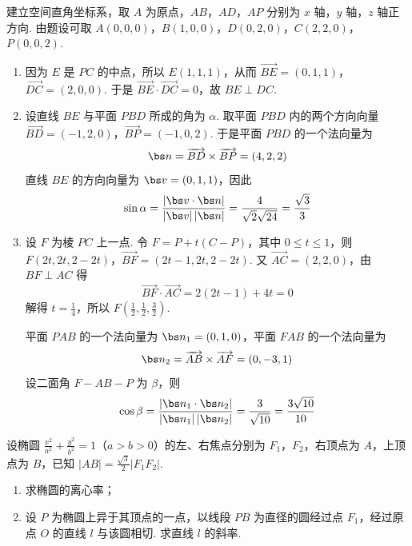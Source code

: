 \begin{solution}
建立空间直角坐标系，取 \(A\) 为原点，\(AB\)，\(AD\)，\(AP\) 分别为 \(x\) 轴，\(y\) 轴，\(z\) 轴正方向. 由题设可取 \(A(0,0,0)\)，\(B(1,0,0)\)，\(D(0,2,0)\)，\(C(2,2,0)\)，\(P(0,0,2)\).

\begin{enumerate}
\item 因为 \(E\) 是 \(PC\) 的中点，所以 \(E(1,1,1)\)，从而 \(\overrightarrow{BE}=(0,1,1)\)，\(\overrightarrow{DC}=(2,0,0)\). 于是 \(\overrightarrow{BE}\cdot\overrightarrow{DC}=0\)，故 \(BE\perp DC\).

\item 设直线 \(BE\) 与平面 \(PBD\) 所成的角为 \(\alpha\). 取平面 \(PBD\) 内的两个方向向量 \(\overrightarrow{BD}=(-1,2,0)\)，\(\overrightarrow{BP}=(-1,0,2)\). 于是平面 \(PBD\) 的一个法向量为
\[
\bs n=\overrightarrow{BD}\times\overrightarrow{BP}=(4,2,2)
\]
直线 \(BE\) 的方向向量为 \(\bs v=(0,1,1)\)，因此
\[
\sin\alpha=\frac{|\bs v\cdot\bs n|}{|\bs v|\,|\bs n|}=\frac{4}{\sqrt2\sqrt{24}}=\frac{\sqrt3}{3}
\]

\item 设 \(F\) 为棱 \(PC\) 上一点. 令 \(F=P+t(C-P)\)，其中 \(0\leqslant t\leqslant1\)，则 \(F(2t,2t,2-2t)\)，\(\overrightarrow{BF}=(2t-1,2t,2-2t)\). 又 \(\overrightarrow{AC}=(2,2,0)\)，由 \(BF\perp AC\) 得
\[
\overrightarrow{BF}\cdot\overrightarrow{AC}=2(2t-1)+4t=0
\]
解得 \(t=\frac14\)，所以 \(F\left(\frac12,\frac12,\frac32\right)\).

平面 \(PAB\) 的一个法向量为 \(\bs n_1=(0,1,0)\)，平面 \(FAB\) 的一个法向量为
\[
\bs n_2=\overrightarrow{AB}\times\overrightarrow{AF}=(0,-3,1)
\]
设二面角 \(F-AB-P\) 为 \(\beta\)，则
\[
\cos\beta=\frac{|\bs n_1\cdot\bs n_2|}{|\bs n_1|\,|\bs n_2|}=\frac{3}{\sqrt{10}}=\frac{3\sqrt{10}}{10}
\]
\end{enumerate}
\end{solution}

\begin{problem}
设椭圆 \(\frac{x^2}{a^2}+\frac{y^2}{b^2}=1\)（\(a>b>0\)）的左、右焦点分别为 \(F_1\)，\(F_2\)，右顶点为 \(A\)，上顶点为 \(B\)，已知 \(|AB|=\frac{\sqrt3}{2}|F_1F_2|\).

\begin{enumerate}
\item 求椭圆的离心率；
\item 设 \(P\) 为椭圆上异于其顶点的一点，以线段 \(PB\) 为直径的圆经过点 \(F_1\)，经过原点 \(O\) 的直线 \(l\) 与该圆相切. 求直线 \(l\) 的斜率.
\end{enumerate}
\end{problem}

